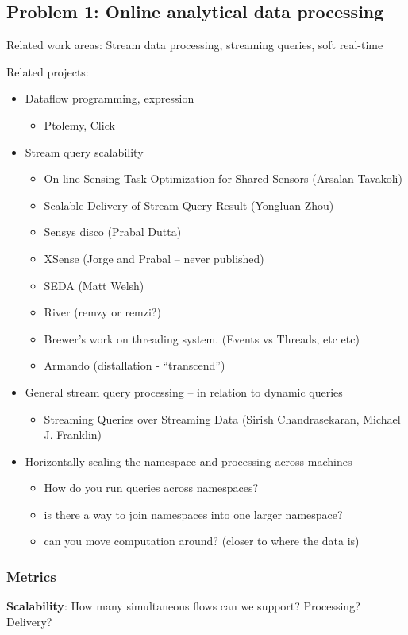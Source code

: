 \subsection{Problem 1:  Online analytical data processing}
Related work areas: Stream data processing, streaming queries, soft real-time

Related projects:  
\begin{itemize}
\item Dataflow programming, expression
	\begin{itemize}
	\item Ptolemy, Click
	\end{itemize}
\item Stream query scalability
	\begin{itemize}
	\item On-line Sensing Task Optimization for Shared Sensors (Arsalan Tavakoli)
	\item Scalable Delivery of Stream Query Result (Yongluan Zhou)
	\item Sensys disco (Prabal Dutta)
	\item XSense (Jorge and Prabal -- never published)
	\item SEDA (Matt Welsh)
	\item River (remzy or remzi?)
	\item Brewer's work on threading system. (Events vs Threads, etc etc)
	\item Armando (distallation - ``transcend'')
	\end{itemize}
\item General stream query processing -- in relation to dynamic queries
	\begin{itemize}
	\item Streaming Queries over Streaming Data (Sirish Chandrasekaran, Michael J. Franklin)
	\end{itemize}
\item Horizontally scaling the namespace and processing across machines
	\begin{itemize}
	\item How do you run queries across namespaces?
	\item is there a way to join namespaces into one larger namespace?
	\item can you move computation around?  (closer to where the data is)
	\end{itemize}
\end{itemize}

\subsubsection{Metrics}
{\bf Scalability}:  How many simultaneous flows can we support?  Processing?  Delivery?

